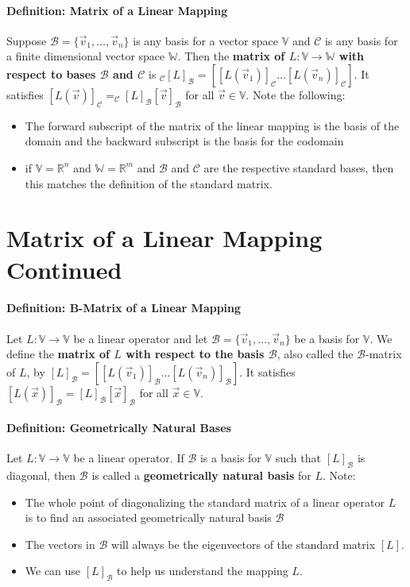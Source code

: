 \documentclass[10pt,letter]{article}
\begin{document}
\paragraph{Definition: Matrix of a Linear Mapping}Suppose $\mathcal{B}=\{\vec{v}_1,\ldots,\vec{v}_n\}$ is any basis for a vector space $\mathbb{V}$ and $\mathcal{C}$ is any basis for a finite dimensional vector space $\mathbb{W}$. Then the \textbf{matrix of $L:\mathbb{V}\rightarrow\mathbb{W}$ with respect to bases $\mathcal{B}$ and $\mathcal{C}$} is $_\mathcal{C}[L]_\mathcal{B}=\left[[L(\vec{v}_1)]_\mathcal{C}\ldots[L(\vec{v}_n)]_\mathcal{C}\right]$. It satisfies $[L(\vec{v})]_\mathcal{C}=_\mathcal{C}[L]_\mathcal{B}[\vec{v}]_\mathcal{B}$ for all $\vec{v}\in\mathbb{V}$. Note the following: 
\begin{itemize}
    \item The forward subscript of the matrix of the linear mapping is the basis of the domain and the backward subscript is the basis for the codomain
    \item if $\mathbb{V}=\mathbb{R}^n$ and $\mathbb{W}=\mathbb{R}^m$ and $\mathcal{B}$ and $\mathcal{C}$ are the respective standard bases, then this matches the definition of the standard matrix. 
\end{itemize}


\section*{Matrix of a Linear Mapping Continued}
\paragraph{Definition: B-Matrix of a Linear Mapping} Let $L:\mathbb{V}\rightarrow\mathbb{V}$ be a linear operator and let $\mathcal{B}=\{\vec{v}_1,\ldots,\vec{v}_n\}$ be a basis for $\mathbb{V}$. We define the \textbf{matrix of $L$ with respect to the basis $\mathcal{B}$}, also called the $\mathcal{B}$-matrix of $L$, by $[L]_\mathcal{B}=\left[[L(\vec{v}_1)]_\mathcal{B}\ldots[L(\vec{v}_n)]_\mathcal{B}\right]$. It satisfies $[L(\vec{x})]_\mathcal{B}=[L]_\mathcal{B}[\vec{x}]_\mathcal{B}$ for all $\vec{x}\in\mathbb{V}$.

\paragraph{Definition: Geometrically Natural Bases} Let $L:\mathbb{V}\rightarrow\mathbb{V}$ be a linear operator. If $\mathcal{B}$ is a basis for $\mathbb{V}$ such that $[L]_\mathcal{B}$ is diagonal, then $\mathcal{B}$ is called a \textbf{geometrically natural basis} for $L$. Note:
\begin{itemize}
    \item The whole point of diagonalizing the standard matrix of a linear operator $L$ is to find an associated geometrically natural basis $\mathcal{B}$ 
    \item The vectors in $\mathcal{B}$ will always be the eigenvectors of the standard matrix $[L]$. 
    \item We can use $[L]_\mathcal{B}$ to help us understand the mapping $L$. 
\end{itemize}
\end{document}
